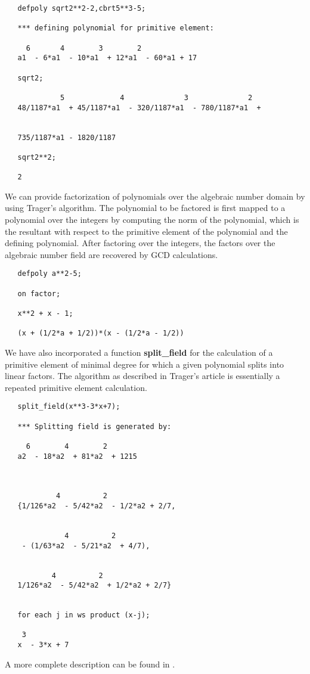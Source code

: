 \example{}

\begin{verbatim}
   defpoly sqrt2**2-2,cbrt5**3-5;

   *** defining polynomial for primitive element:

     6       4        3        2
   a1  - 6*a1  - 10*a1  + 12*a1  - 60*a1 + 17

   sqrt2;

             5             4              3              2
   48/1187*a1  + 45/1187*a1  - 320/1187*a1  - 780/1187*a1  +


   735/1187*a1 - 1820/1187

   sqrt2**2;

   2
\end{verbatim}

We can provide factorization of polynomials over the algebraic number
domain by using Trager's algorithm.  The polynomial to be factored is first
mapped to a polynomial over the integers by computing the norm of the
polynomial, which is the resultant with respect to the primitive element of
the polynomial and the defining polynomial.  After factoring over the
integers, the factors over the algebraic number field are recovered by GCD
calculations.

\example{}

\begin{verbatim}
   defpoly a**2-5;

   on factor;

   x**2 + x - 1;

   (x + (1/2*a + 1/2))*(x - (1/2*a - 1/2))
\end{verbatim}
\hypertarget{operator:SPLIT_FIELD}{}
We have also incorporated a function {\bf split\_field} for the calculation
of a primitive element of minimal degree for which a given polynomial splits
into linear factors.  The algorithm as described in Trager's article is
essentially a repeated primitive element calculation.

\example{}

\begin{verbatim}
   split_field(x**3-3*x+7);

   *** Splitting field is generated by:

     6        4        2
   a2  - 18*a2  + 81*a2  + 1215



            4          2
   {1/126*a2  - 5/42*a2  - 1/2*a2 + 2/7,


              4          2
    - (1/63*a2  - 5/21*a2  + 4/7),


           4          2
   1/126*a2  - 5/42*a2  + 1/2*a2 + 2/7}


   for each j in ws product (x-j);

    3
   x  - 3*x + 7
\end{verbatim}

A more complete description can be found in \cite{Bradford:86}.
